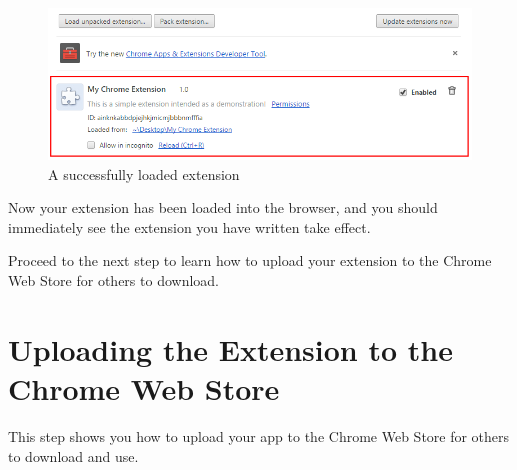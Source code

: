 \documentclass[11pt]{article}
\begin{document}
\begin{enumerate}
	\begin{figure}[htb]
	\centering
	\includegraphics[width=1\textwidth]{figures/loadedext.png}
	\caption{A successfully loaded extension\label{fig:loadedext}}
	\end{figure}
\end{enumerate}

Now your extension has been loaded into the browser, and you should immediately see the extension you have written take effect.

Proceed to the next step to learn how to upload your extension to the Chrome Web Store for others to download.

\newpage

\section{Uploading the Extension to the Chrome Web Store}

This step shows you how to upload your app to the Chrome Web Store for others to download and use.
\end{document}

